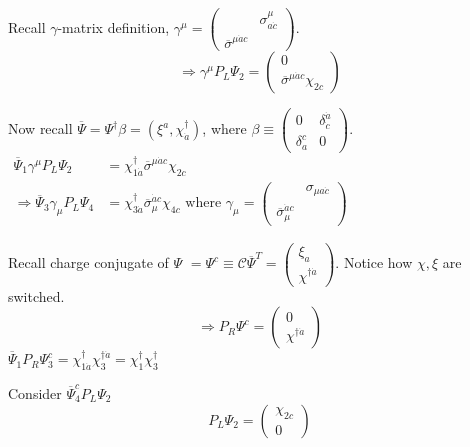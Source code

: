 \documentclass[twoside]{amsart}
\begin{document}
\begin{itemize}
Recall $\gamma$-matrix definition, $\gamma^{\mu}  = \left( \begin{matrix} & \sigma^{\mu}_{a\dot{c}} \\ \overline{\sigma}^{\mu \dot{a} c} & \end{matrix} \right)$.  
\[
\Longrightarrow \gamma^{\mu} P_L \Psi_2 = \left( \begin{matrix} 0 \\ \overline{\sigma}^{\mu \dot{a} c} \chi_{2c} \end{matrix} \right)
\]

Now recall $\overline{\Psi} = \Psi^{\dag} \beta = ( \xi^a, \chi_{\dot{a}}^{\dag} )$, where $\beta \equiv \left( \begin{matrix} 0 & \delta^{\dot{a}}_{\dot{c}}  \\ \delta_a^c & 0 \end{matrix} \right)$.  \\

$\begin{aligned} 
  \overline{\Psi}_1 \gamma^{\mu} P_L \Psi_2 & = \chi_{1\dot{a}}^{\dag} \overline{\sigma}^{\mu \dot{a} c } \chi_{2c}  \\
  \Longrightarrow \overline{\Psi}_3 \gamma_{\mu} P_L \Psi_4 & = \chi_{3\dot{a}}^{\dag} \overline{\sigma}_{\mu}^{\dot{a} c} \chi_{4c} \text{ where } \gamma_{\mu} = \left( \begin{matrix} & \sigma_{\mu a\dot{c}} \\ \overline{\sigma}_{\mu}^{\dot{a} c} & \end{matrix} \right)
\end{aligned}$ 

Recall charge conjugate of $\Psi$ $= \Psi^c \equiv \mathcal{C} \overline{\Psi}^T = \left( \begin{matrix} \xi_a \\ \chi^{\dag \dot{a}} \end{matrix} \right)$.  Notice how $\chi, \xi$ are switched.  
\[
\Longrightarrow P_R \Psi^c = \left( \begin{matrix} 0 \\ \chi^{\dag \dot{a}} \end{matrix} \right)
\]
$\overline{\Psi}_1 P_R \Psi_3^c = \chi_{1\dot{a}}^{\dag} \chi_3^{\dag \dot{a}} = \chi_1^{\dag} \chi_3^{\dag}$

Consider $\overline{\Psi}^c_4 P_L \Psi_2$
\[
P_L \Psi_2 = \left( \begin{matrix} \chi_{2c} \\ 0 \end{matrix} \right)
\]


\end{itemize}
\end{document}
